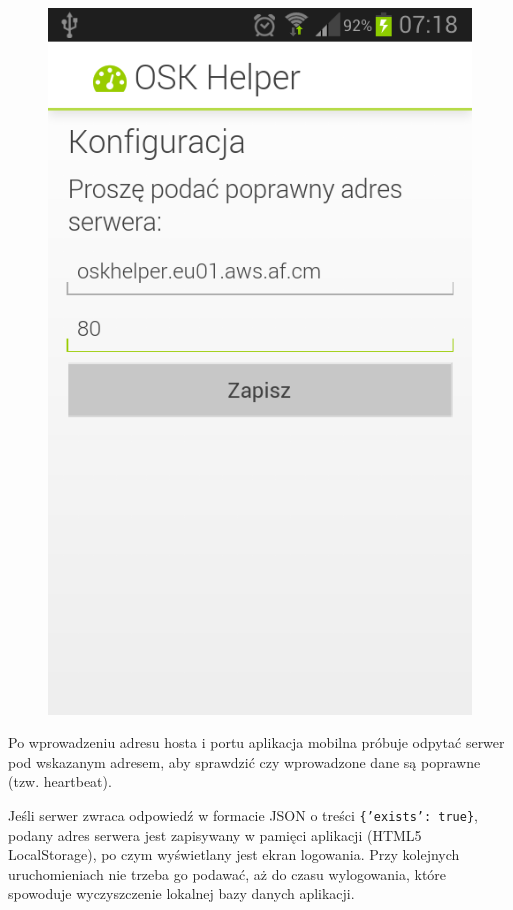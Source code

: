 \documentclass[twoside,a4paper,openright,12pt]{book}
\begin{document}
\begin{figure}[H]
\begin{minipage}{.48\textwidth}
  \includegraphics[width=1\linewidth]{screenshots/android/konfiguracja_serwera-wypelnione.png}
  \label{fig:ekran_poczatkowy2}
\end{minipage}
\end{figure}

Po wprowadzeniu adresu hosta i portu aplikacja mobilna próbuje odpytać serwer pod wskazanym adresem, aby sprawdzić czy wprowadzone dane są poprawne (tzw. heartbeat).

Jeśli serwer zwraca odpowiedź w formacie JSON o treści \texttt{\{'exists': true\}}, podany adres serwera jest zapisywany w pamięci aplikacji (HTML5 LocalStorage), po czym wyświetlany jest ekran logowania. Przy kolejnych uruchomieniach nie trzeba go podawać, aż do czasu wylogowania, które spowoduje wyczyszczenie lokalnej bazy danych aplikacji.
\end{document}

